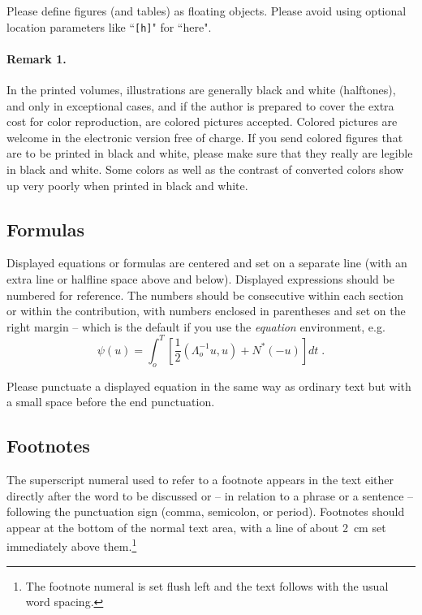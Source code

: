 \documentclass[lnicst,sechang,a4paper]{svmultln}
\begin{document}
Please define figures (and tables) as floating objects. Please avoid
using optional location parameters like ``\verb+[h]+" for ``here".

\paragraph{Remark 1.}

In the printed volumes, illustrations are generally black and white
(halftones), and only in exceptional cases, and if the author is
prepared to cover the extra cost for color reproduction, are colored
pictures accepted. Colored pictures are welcome in the electronic
version free of charge. If you send colored figures that are to be
printed in black and white, please make sure that they really are
legible in black and white. Some colors as well as the contrast of
converted colors show up very poorly when printed in black and white.

\subsection{Formulas}

Displayed equations or formulas are centered and set on a separate
line (with an extra line or halfline space above and below). Displayed
expressions should be numbered for reference. The numbers should be
consecutive within each section or within the contribution,
with numbers enclosed in parentheses and set on the right margin --
which is the default if you use the \emph{equation} environment, e.g.
\begin{equation}
  \psi (u) = \int_{o}^{T} \left[\frac{1}{2}
  \left(\Lambda_{o}^{-1} u,u\right) + N^{\ast} (-u)\right] dt \;  .
\end{equation}

Please punctuate a displayed equation in the same way as ordinary
text but with a small space before the end punctuation.

\subsection{Footnotes}

The superscript numeral used to refer to a footnote appears in the text
either directly after the word to be discussed or -- in relation to a
phrase or a sentence -- following the punctuation sign (comma,
semicolon, or period). Footnotes should appear at the bottom of
the
normal text area, with a line of about 2~cm set
immediately above them.\footnote{The footnote numeral is set flush left
and the text follows with the usual word spacing.}
\end{document}
